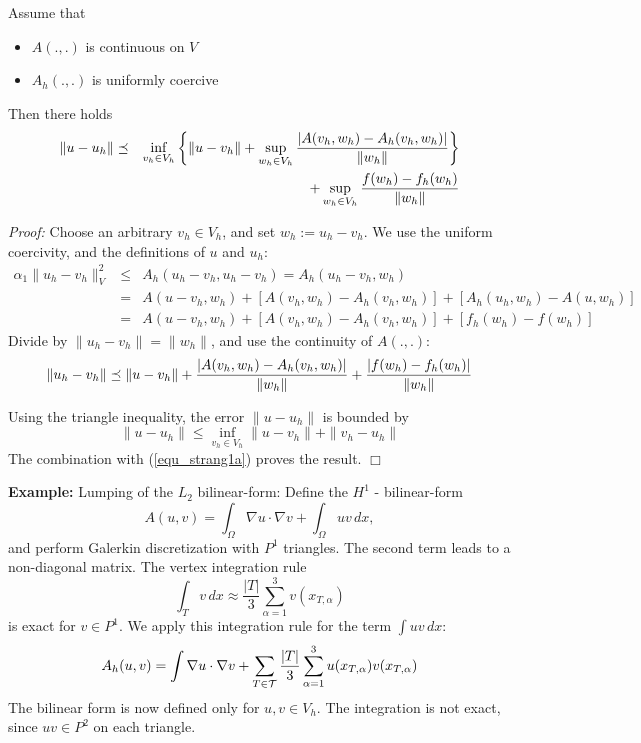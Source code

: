 \begin{lemma} Assume that
\begin{itemize}
\item $A(.,.)$ is continuous on $V$
\item $A_h(.,.)$ is uniformly coercive 
\end{itemize}
Then there holds
\begin{eqnarray*}
\| u - u_h \| & \preceq & \inf_{v_h \in V_h} \left\{
        \| u - v_h \| + \sup_{w_h \in V_h} \frac{|A(v_h, w_h) - A_h (v_h, w_h)|}{\| w_h \|} \right\} \\
        & & 
        + \sup_{w_h \in V_h} \frac{f(w_h) - f_h (w_h)}{\| w_h \|}
\end{eqnarray*}
\end{lemma}     
{\em Proof:} 
Choose an arbitrary $v_h \in V_h$, and set $w_h := u_h - v_h$.
We use the uniform coercivity, and the definitions of $u$ and $u_h$:
\begin{eqnarray*}
\alpha_1 \| u_h - v_h \|_V^2 & \leq & A_h (u_h - v_h, u_h - v_h) = A_h (u_h - v_h, w_h) \\
        & = & A(u-v_h, w_h) + [ A(v_h, w_h) - A_h(v_h, w_h) ] + [ A_h (u_h, w_h) - A(u, w_h)] \\
        & = & A(u-v_h, w_h) + [ A(v_h, w_h) - A_h(v_h, w_h) ] + [ f_h(w_h) - f(w_h)]
\end{eqnarray*}
Divide by $\| u_h - v_h \| = \| w_h \|$, and use the continuity of $A(.,.)$:
\begin{equation}
\label{equ_strang1a}
\| u_h - v_h \| \preceq \| u - v_h \| + \frac{|A(v_h, w_h) - A_h(v_h, w_h)|}{\| w_h  \|} + \frac{ | f(w_h) - f_h(w_h) | } { \| w_h \| }
\end{equation}

Using the triangle inequality, the error $\| u - u_h \|$ is bounded by
$$
\| u - u_h \| \leq \inf_{v_h \in V_h} \| u - v_h \| + \| v_h - u_h \|
$$
The combination with (\ref{equ_strang1a}) proves the result. 
\hfill $\Box$

\bigskip

{\bf Example:} Lumping of the $L_2$ bilinear-form: \newline
Define the $H^1$ - bilinear-form
$$
A(u,v) = \int_\Omega \nabla u \cdot \nabla v + \int_\Omega u v \, dx,
$$
and perform Galerkin discretization with $P^1$ triangles.
The second term leads to a non-diagonal matrix. 
The vertex integration rule
$$
\int_T v \, dx \approx \frac{|T|}{3} \sum_{\alpha = 1}^3 v(x_{T,\alpha})
$$
is exact for $v \in P^1$. We apply this integration rule for the term
$\int u v \, dx$:
$$
A_h(u,v) = \int \nabla u \cdot \nabla v + 
\sum_{T \in {\cal T}} \frac{|T|}{3} \sum_{\alpha = 1}^3 u(x_{T,\alpha}) v(x_{T,\alpha})
$$
The bilinear form is now defined only for $u, v \in V_h$.
The integration is not exact, since $u v \in P^2$ on each triangle.

